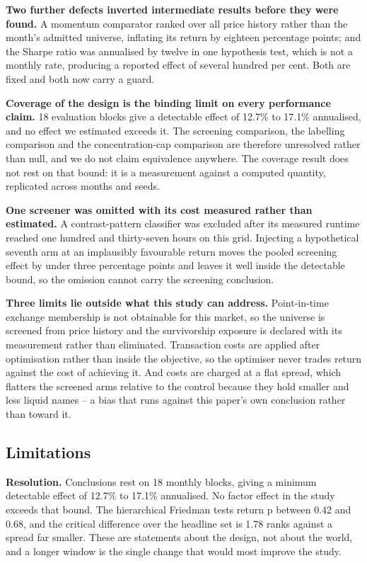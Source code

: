 \documentclass[preprint,11pt,authoryear]{elsarticle}
\begin{document}
\textbf{Two further defects inverted intermediate results before they were found.} A momentum comparator ranked over all price history rather than the month's admitted universe, inflating its return by eighteen percentage points; and the Sharpe ratio was annualised by twelve in one hypothesis test, which is not a monthly rate, producing a reported effect of several hundred per cent. Both are fixed and both now carry a guard.

\textbf{Coverage of the design is the binding limit on every performance claim.} 18 evaluation blocks give a detectable effect of 12.7\% to 17.1\% annualised, and no effect we estimated exceeds it. The screening comparison, the labelling comparison and the concentration-cap comparison are therefore unresolved rather than null, and we do not claim equivalence anywhere. The coverage result does not rest on that bound: it is a measurement against a computed quantity, replicated across months and seeds.

\textbf{One screener was omitted with its cost measured rather than estimated.} A contrast-pattern classifier was excluded after its measured runtime reached one hundred and thirty-seven hours on this grid. Injecting a hypothetical seventh arm at an implausibly favourable return moves the pooled screening effect by under three percentage points and leaves it well inside the detectable bound, so the omission cannot carry the screening conclusion.

\textbf{Three limits lie outside what this study can address.} Point-in-time exchange membership is not obtainable for this market, so the universe is screened from price history and the survivorship exposure is declared with its measurement rather than eliminated. Transaction costs are applied after optimisation rather than inside the objective, so the optimiser never trades return against the cost of achieving it. And costs are charged at a flat spread, which flatters the screened arms relative to the control because they hold smaller and less liquid names -- a bias that runs against this paper's own conclusion rather than toward it.


\subsection{Limitations}\label{sec:limitations}

\textbf{Resolution.} Conclusions rest on 18 monthly blocks, giving a minimum detectable effect of 12.7\% to 17.1\% annualised. No factor effect in the study exceeds that bound. The hierarchical Friedman tests return p between 0.42 and 0.68, and the critical difference over the headline set is 1.78 ranks against a spread far smaller. These are statements about the design, not about the world, and a longer window is the single change that would most improve the study.
\end{document}
